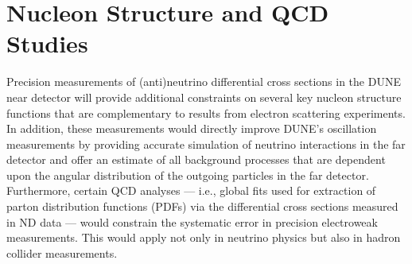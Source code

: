 \section{Nucleon Structure and QCD Studies}
\label{sec-nucleon}

  Precision measurements of (anti)neutrino differential cross sections
  in the DUNE near detector will provide additional constraints on
  several key nucleon structure functions that are complementary to
  results from electron scattering experiments.
  In addition, these measurements would directly improve DUNE's
  oscillation measurements by providing accurate simulation of
  neutrino interactions in the far detector and offer an estimate of
  all background processes that are dependent upon the angular
  distribution of the outgoing particles in the far detector.
%
  Furthermore, certain QCD analyses --- i.e., global fits used for extraction of
  parton distribution functions (PDFs) via 
  the differential cross sections measured in ND data ---
  would constrain the systematic error in 
  precision electroweak measurements. This would apply  
  not only in neutrino physics but also in hadron collider measurements.  

